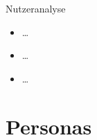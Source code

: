 \documentclass[presentation,bigger,aspectratio=169]{beamer}
\begin{document}
\begin{frame}[label={sec:orga205e7e}]{Nutzeranalyse}
\begin{itemize}
\item \ldots{}
\item \ldots{}
\item \ldots{}
\end{itemize}
\end{frame}
\section{Personas}
\label{sec:org7f38b20}
\begin{frame}[label={sec:org7a60756}]{\vspace{2.2cm}\begin{center}\MakeUppercase{\insertsection}\end{center}}
\end{frame}
\end{document}
